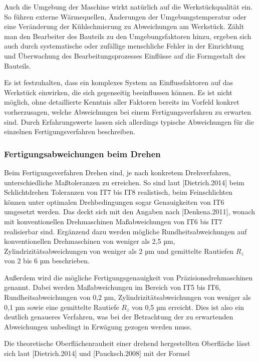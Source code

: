 Auch die Umgebung der Maschine wirkt natürlich auf die Werkstückqualität ein. So führen externe Wärmequellen, Änderungen der Umgebungstemperatur oder eine Veränderung der Kühlschmierung zu Abweichungen am Werkstück. Zählt man den Bearbeiter des Bauteils zu den Umgebungsfaktoren hinzu, ergeben sich auch durch systematische oder zufällige menschliche Fehler in der Einrichtung und Überwachung des Bearbeitungsprozesses Einflüsse auf die Formgestalt des Bauteils. 

Es ist festzuhalten, dass ein komplexes System an Einflussfaktoren auf das Werkstück einwirken, die sich gegenseitig beeinflussen können. Es ist nicht möglich, ohne detaillierte Kenntnis aller Faktoren bereits im Vorfeld konkret vorherzusagen, welche Abweichungen bei einem Fertigungsverfahren zu erwarten sind. Durch Erfahrungswerte lassen sich allerdings typische Abweichungen für die einzelnen Fertigungsverfahren beschreiben. 

\subsubsection {Fertigungsabweichungen beim Drehen}

Beim Fertigungsverfahren Drehen sind, je nach konkretem Drehverfahren, unterschiedliche Maßtoleranzen zu erreichen. So sind laut [Dietrich.2014] beim Schlichtdrehen Toleranzen von IT7 bis IT8 realistisch, beim Feinschlichten können unter optimalen Drehbedingungen sogar Genauigkeiten von IT6 umgesetzt werden. Das deckt sich mit den Angaben nach [Denkena.2011], wonach mit konventionellen Drehmaschinen Maßabweichungen von IT6 bis IT7 realisierbar sind. Ergänzend dazu werden mögliche Rundheitsabweichungen auf konventionellen Drehmaschinen von weniger als 2,5 µm, Zylindrizitätsabweichungen von weniger als 2 µm und gemittelte Rautiefen $R_{z}$ von 2 bis 6 µm beschrieben. 

Außerdem wird die mögliche Fertigungsgenauigkeit von Präzisionsdrehmaschinen genannt. Dabei werden Maßabweichungen im Bereich von IT5 bis IT6, Rundheitsabweichungen von 0,2 µm, Zylindrizitätsabweichungen von weniger als 0,1 µm sowie eine gemittelte Rautiefe $R_{z}$ von 0,5 µm erreicht. Dies ist also ein deutlich genaueres Verfahren, was bei der Betrachtung der zu erwartenden Abweichungen unbedingt in Erwägung gezogen werden muss. 

Die theoretische Oberflächenrauheit einer drehend hergestellten Oberfläche lässt sich laut [Dietrich.2014] und [Paucksch.2008] mit der Formel 

